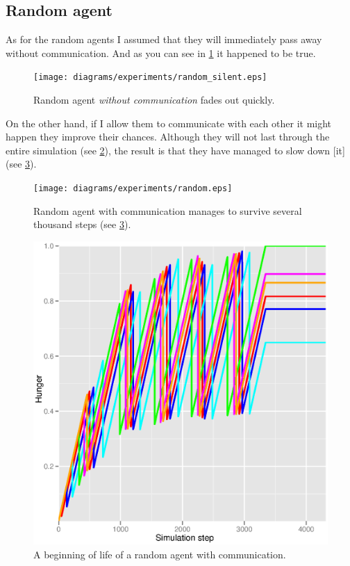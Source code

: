 \subsection{Random agent}   

As for the random agents I assumed that they will immediately pass away without communication. And as you can see in \ref{experiments:random-silent} it happened to be true. 

\begin{figure}
  \centering                                
  \texttt{[image: diagrams/experiments/random\_silent.eps]}    
  \caption{Random agent \emph{without communication} fades out quickly.}
  \label{experiments:random-silent}
\end{figure}    

On the other hand, if I allow them to communicate with each other it might happen they improve their chances. Although they will not last through the entire simulation (see \ref{experiments:gng-grid-pr-random}), the result is that they have managed to slow down [it] (see \ref{experiments:random-start}).

\begin{figure}
  \centering                                
  \texttt{[image: diagrams/experiments/random.eps]}    
  \caption{Random agent with communication manages to survive several thousand steps (see \ref{experiments:random-start}).}
  \label{experiments:gng-grid-pr-random}
\end{figure}             

\begin{figure}
  \centering                                
  \includegraphics[scale=0.4]{diagrams/experiments/random_start.eps}    
  \caption{A beginning of life of a random agent with communication.}
  \label{experiments:random-start}
\end{figure}        

